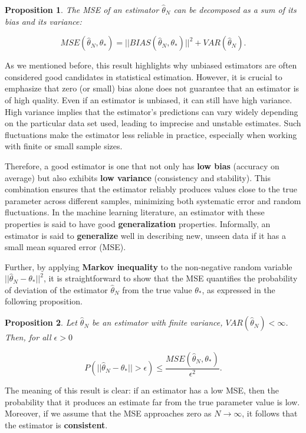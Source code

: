 \documentclass{report}
\newtheorem{proposition}{Proposition}[chapter]
\begin{document}
\begin{proposition}
The MSE of an estimator $\hat{\theta}_N$ can be decomposed as a sum of its bias and its variance:

\begin{equation}
MSE(\hat{\theta}_N,\theta_*) = ||BIAS(\hat{\theta}_N,\theta_*)||^2 + VAR(\hat{\theta}_N).
\end{equation}
\end{proposition}
As we mentioned before, this result highlights why unbiased estimators are often considered good candidates in statistical estimation. However, it is crucial to emphasize that zero (or small) bias alone does not guarantee that an estimator is of high quality. Even if an estimator is unbiased, it can still have high variance. High variance implies that the estimator’s predictions can vary widely depending on the particular data set used, leading to imprecise and unstable estimates. Such fluctuations make the estimator less reliable in practice, especially when working with finite or small sample sizes.

Therefore, a good estimator is one that not only has \textbf{low bias} (accuracy on average) but also exhibits \textbf{low variance} (consistency and stability). This combination ensures that the estimator reliably produces values close to the true parameter across different samples, minimizing both systematic error and random fluctuations. In the machine learning literature, an estimator with these properties is said to have good \textbf{generalization} properties. Informally, an estimator is said to \textbf{generalize} well in describing new, unseen data if it has a small mean squared error (MSE).

Further, by applying \textbf{Markov inequality} to the non-negative random variable $||\hat{\theta}_N- \theta_*||^2$, it is straightforward to show that the MSE quantifies the probability of deviation of the estimator $\hat{\theta}_N$ from the true value $\theta_*$, as expressed in the following proposition.

\begin{proposition}
Let $\hat{\theta}_N$ be an estimator with finite variance, $VAR(\hat{\theta}_N) < \infty$. Then, for all $\epsilon > 0$

\begin{equation}
P(||\hat{\theta}_N -\theta_*|| > \epsilon) \leq \frac{MSE(\hat{\theta}_N,\theta_*)}{\epsilon ^ 2}.
\end{equation}
\end{proposition}
The meaning of this result is clear: if an estimator has a low MSE, then the probability that it produces an estimate far from the true parameter value is low. Moreover, if we assume that the MSE approaches zero as $N \to \infty$, it follows that the estimator is \textbf{consistent}.
\end{document}
